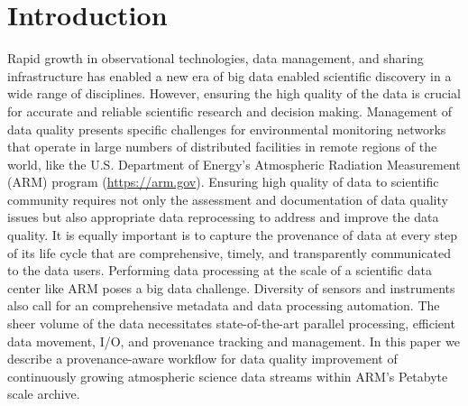 \section{Introduction}
Rapid growth in observational technologies, data management, and
sharing infrastructure has enabled a new era of big data enabled
scientific
discovery in a wide range of disciplines. However, ensuring the high
quality of the data is crucial for accurate and reliable scientific
research and decision making. Management of data quality
presents specific challenges for environmental monitoring networks that
operate in
large numbers of distributed facilities in remote regions of the world,
like the U.S. Department of Energy's Atmospheric Radiation Measurement (ARM)
program (\url{https://arm.gov}). Ensuring high quality of data to
scientific community requires not only  the assessment and
documentation of data quality issues but also appropriate data reprocessing to
address and improve the data quality.
It is equally important is to capture the provenance of data at every step of
its life cycle that are comprehensive, timely, and transparently
communicated to the data users.
Performing data processing at the scale of a scientific data center
like ARM poses a big data challenge. Diversity of sensors and instruments
also call for an comprehensive metadata and data processing automation.
The sheer volume of the data necessitates state-of-the-art parallel processing,
efficient data movement, I/O, and provenance tracking and management.
In this paper we describe a provenance-aware workflow for
data quality improvement of continuously growing
atmospheric science data streams within ARM's Petabyte scale archive.


